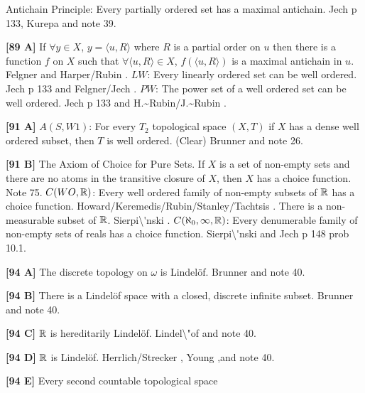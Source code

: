 \medskip
{} Antichain Principle:  Every partially ordered
set has a maximal antichain. \ac{Jech} \cite{1973b} p 133, \ac{Kurepa}
\cite{1953} and note 39.  
\smallskip
\item{}{\bf [89 A]}  If $\forall y\in X$, $y = \langle u,R\rangle$ where
$R$ is a partial order on $u$ then there is a function $f$ on $X$ such that
$\forall\langle u,R\rangle\in X$, $f(\langle u,R\rangle)$ is a maximal
antichain in $u$.  \ac{Felgner} \cite{1969} and \ac{Harper/Rubin}
\cite{1976}.
\medskip
{} $LW$:  Every linearly ordered set can be well
ordered. \ac{Jech} \cite{1973b} p 133 and \ac{Felgner/Jech} \cite{1973}.
\medskip
{} $PW$:  The power set of a well ordered set can be
well ordered.  \ac{Jech} \cite{1973b} p 133 and \ac{H.~Rubin/J.~Rubin}
\cite{1985}.
\smallskip
\item{}{\bf [91 A]} $A(S,W1)$:  For every $T_2$ topological space $(X,T)$
if $X$ has  a dense well ordered subset, then $T$ is well ordered. (Clear)
\ac{Brunner} \cite{1983d} and note 26.
\smallskip
\item{}{\bf [91 B]}  The Axiom of Choice for Pure Sets.  If
$X$ is a set of non-empty sets and there are no atoms in the
transitive closure of $X$, then $X$ has a choice function.
Note 75.
\medskip
{} $C(WO,{\Bbb R})$:  Every well ordered family of
non-empty subsets of ${\Bbb R}$ has a choice function.
\ac{Howard/Keremedis/Rubin/Stanley/Tachtsis} \cite{1999}.
\medskip
{} There is a non-measurable subset of ${\Bbb R}$.
\ac{Sierpi\'nski} \cite{1918}.
\medskip
{} $C(\aleph_{0},\infty,{\Bbb R})$: Every denumerable
family of non-empty sets of reals  has a choice function. \ac{Sierpi\'nski}
\cite{1918} and \ac{Jech} \cite{1973b} p 148 prob 10.1.
\smallskip
\item{}{\bf [94 A]}  The discrete topology on $\omega$ is Lindel\"of.
\ac{Brunner} \cite{1982d} and note 40.
\smallskip
\item{}{\bf [94 B]}  There is a Lindel\"of space with a closed, discrete
infinite subset.  \ac{Brunner} \cite{1982d} and note 40.
\smallskip
\item{}{\bf [94 C]} ${\Bbb R}$ is hereditarily Lindel\"of.
\ac{Lindel\"of} \cite{1905} and note 40.
\smallskip
\item{}{\bf [94 D]} ${\Bbb R}$ is Lindel\"of.  \ac{Herrlich/Strecker}
\cite{1997}, \ac{Young} \cite{1903},and note 40.
\smallskip
\item{}{\bf [94 E]} Every second countable topological space
